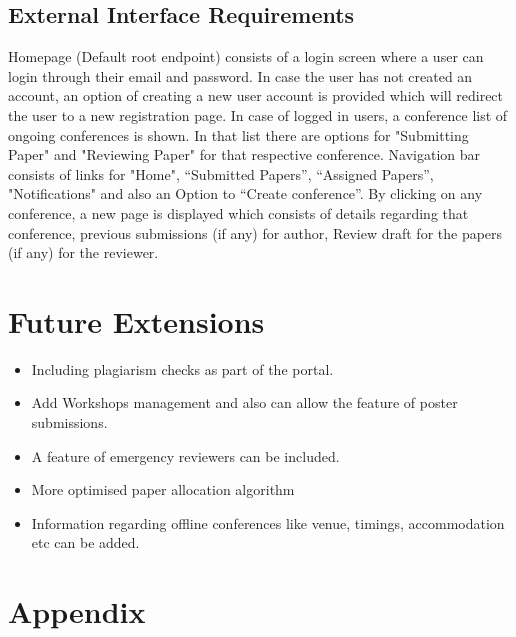 \documentclass[english,a4paper,12pt]{report}
\begin{document}
\section{External Interface Requirements}

\hspace{3cm} Homepage (Default root endpoint) consists of a login screen where a user can login
through their email and password. In case the user has not created an account, an
option of creating a new user account is provided which will redirect the user to a new
registration page.
In case of logged in users, a conference list of ongoing conferences is shown. In that list there are options for "Submitting Paper" and "Reviewing Paper" for that respective conference. Navigation bar consists of links for
"Home", “Submitted Papers”, “Assigned Papers”, "Notifications" and also an Option to “Create conference”.
By clicking on any conference, a new page is displayed which consists of details regarding that conference, previous submissions (if any) for author, Review draft for the papers (if any) for the reviewer.


\chapter{Future Extensions}
\begin{itemize}
    \item Including plagiarism checks as part of the portal.
    \item Add Workshops management and also can allow the feature of poster submissions.
    \item A feature of emergency reviewers can be included.
    \item More optimised paper allocation algorithm
    \item Information regarding offline conferences like venue, timings, accommodation  etc can be added.
\end{itemize}


\chapter{Appendix}
\end{document}
